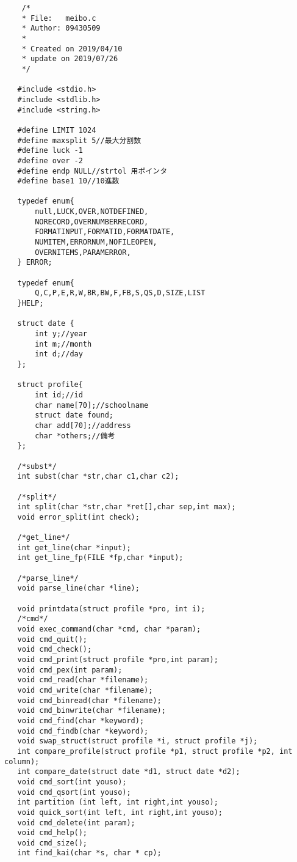 \documentclass[a4j,11pt]{jarticle}
\begin{document}
\begin{lstlisting}
    /* 
    * File:   meibo.c
    * Author: 09430509
    *
    * Created on 2019/04/10
    * update on 2019/07/26
    */
   
   #include <stdio.h>
   #include <stdlib.h>
   #include <string.h>
   
   #define LIMIT 1024
   #define maxsplit 5//最大分割数
   #define luck -1
   #define over -2
   #define endp NULL//strtol 用ポインタ
   #define base1 10//10進数
   
   typedef enum{
       null,LUCK,OVER,NOTDEFINED,
       NORECORD,OVERNUMBERRECORD,
       FORMATINPUT,FORMATID,FORMATDATE,
       NUMITEM,ERRORNUM,NOFILEOPEN,
       OVERNITEMS,PARAMERROR,
   } ERROR;
   
   typedef enum{
       Q,C,P,E,R,W,BR,BW,F,FB,S,QS,D,SIZE,LIST
   }HELP;
   
   struct date {
       int y;//year
       int m;//month
       int d;//day
   };
   
   struct profile{
       int id;//id
       char name[70];//schoolname
       struct date found;
       char add[70];//address
       char *others;//備考
   };
   
   /*subst*/
   int subst(char *str,char c1,char c2);
   
   /*split*/
   int split(char *str,char *ret[],char sep,int max);
   void error_split(int check);
   
   /*get_line*/
   int get_line(char *input);
   int get_line_fp(FILE *fp,char *input);
   
   /*parse_line*/
   void parse_line(char *line);
   
   void printdata(struct profile *pro, int i);
   /*cmd*/
   void exec_command(char *cmd, char *param);
   void cmd_quit();
   void cmd_check();
   void cmd_print(struct profile *pro,int param);
   void cmd_pex(int param);
   void cmd_read(char *filename);
   void cmd_write(char *filename);
   void cmd_binread(char *filename);
   void cmd_binwrite(char *filename);
   void cmd_find(char *keyword);
   void cmd_findb(char *keyword);
   void swap_struct(struct profile *i, struct profile *j);
   int compare_profile(struct profile *p1, struct profile *p2, int column);
   int compare_date(struct date *d1, struct date *d2);
   void cmd_sort(int youso);
   void cmd_qsort(int youso);
   int partition (int left, int right,int youso);
   void quick_sort(int left, int right,int youso);
   void cmd_delete(int param);
   void cmd_help();
   void cmd_size();
   int find_kai(char *s, char * cp);
   

\end{lstlisting}
\end{document}
